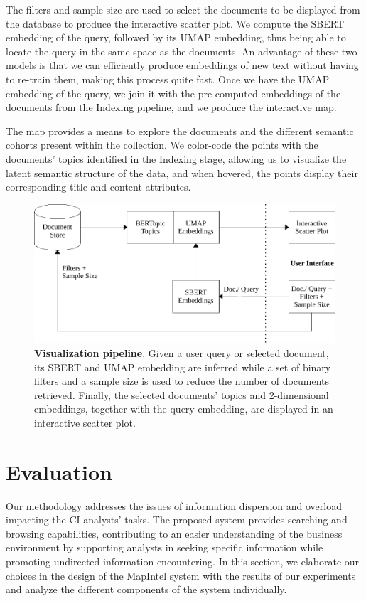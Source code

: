 \documentclass[a4paper]{article}
\begin{document}
The filters and sample size are used to select the documents to be displayed from the database to produce the interactive scatter plot. We compute the SBERT embedding of the query, followed by its UMAP embedding, thus being able to locate the query in the same space as the documents. An advantage of these two models is that we can efficiently produce embeddings of new text without having to re-train them, making this process quite fast. Once we have the UMAP embedding of the query, we join it with the pre-computed embeddings of the documents from the Indexing pipeline, and we produce the interactive map.

The map provides a means to explore the documents and the different semantic cohorts present within the collection. We color-code the points with the documents' topics identified in the Indexing stage, allowing us to visualize the latent semantic structure of the data, and when hovered, the points display their corresponding title and content attributes.

\begin{figure}[H]
  \centering
  \includegraphics[scale=0.7]{./assets/vis_pipeline}
  \caption{\textbf{Visualization pipeline}. Given a user query or selected document, its SBERT and UMAP embedding are inferred while a set of binary filters and a sample size is used to reduce the number of documents retrieved. Finally, the selected documents' topics and 2-dimensional embeddings, together with the query embedding, are displayed in an interactive scatter plot.}
  \label{vis_pipeline}
\end{figure}

\section{Evaluation}
Our methodology addresses the issues of information dispersion and overload impacting the CI analysts' tasks. The proposed system provides searching and browsing capabilities, contributing to an easier understanding of the business environment by supporting analysts in seeking specific information while promoting undirected information encountering. In this section, we elaborate our choices in the design of the MapIntel system with the results of our experiments and analyze the different components of the system individually.
\end{document}
